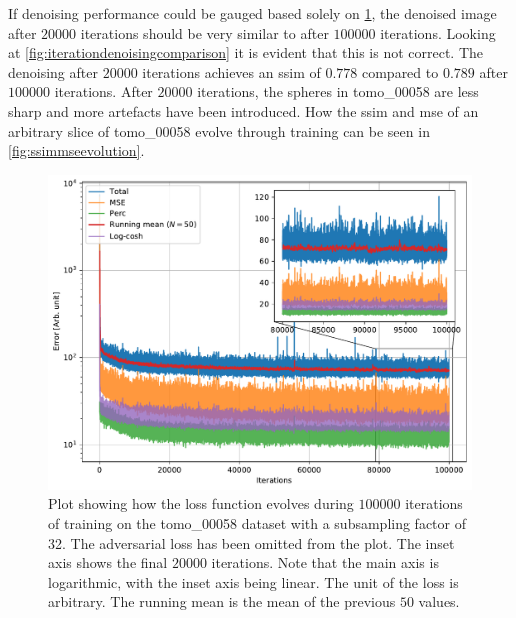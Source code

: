 If denoising performance could be gauged based solely on \cref{fig:losstomo00058noadv}, the denoised image after $20000$ iterations should be very similar to after $100000$ iterations. Looking at \cref{fig:iterationdenoisingcomparison} it is evident that this is not correct. The denoising after $20000$ iterations achieves an \gls{ssim} of $0.778$ compared to $0.789$ after $100000$ iterations. After $20000$ iterations, the spheres in tomo\_00058 are less sharp and more artefacts have been introduced. How the \gls{ssim} and \gls{mse} of an arbitrary slice of tomo\_00058 evolve through training can be seen in \cref{fig:ssimmseevolution}.

\begin{figure}[htbp]
  \centering
  \includegraphics[width=.85\textwidth]{figures/losstomo00058ns32itd4mse035logcosh3depth1.pdf}
  \caption[Loss function evolution during training]{Plot showing how the loss function evolves during $100000$ iterations of training on the tomo\_00058 dataset with a subsampling factor of 32. The adversarial loss has been omitted from the plot. The inset axis shows the final $20000$ iterations. Note that the main axis is logarithmic, with the inset axis being linear. The unit of the loss is arbitrary. The running mean is the mean of the previous $50$ values. }
  \label{fig:losstomo00058noadv}
\end{figure}

